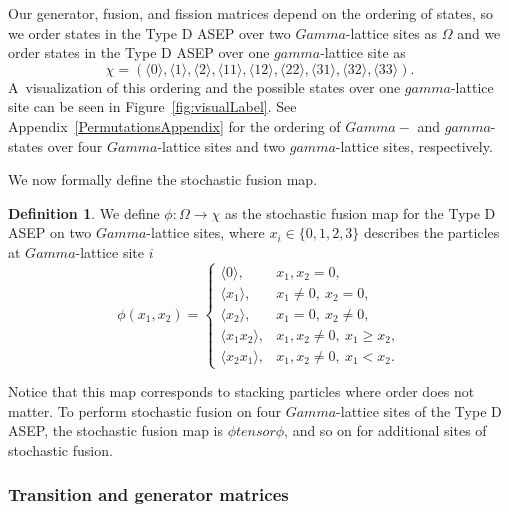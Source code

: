 \documentclass[10pt,a4paper]{amsart}
\numberwithin{equation}{section}
\theoremstyle{definition}
\newtheorem{Definition}[Theorem]{Definition}
\def\Gamma{Gamma}
\def\gamma{gamma}
\def\otimes{ tensor }
\begin{document}
Our generator, fusion, and fission matrices depend on the ordering of states, so we order states in the Type D ASEP over two $\Gamma$-lattice sites as $\Omega$ and we order states in the Type D ASEP over one $\gamma$-lattice site as
\[\chi = ( \langle 0 \rangle,\langle 1 \rangle, \langle 2 \rangle, \langle 11 \rangle, \langle 12 \rangle, \langle 22 \rangle,\langle 31 \rangle,\langle 32 \rangle, \langle 33 \rangle ). \]
 A~visualization of this ordering and the possible states over one $\gamma$-lattice site can be seen in Figure~\ref{fig:visualLabel}. See Appendix~\ref{PermutationsAppendix} for the ordering of $\Gamma-$ and $\gamma$-states over four $\Gamma$-lattice sites and two $\gamma$-lattice sites, respectively.

We now formally define the stochastic fusion map.

\begin{Definition}
\label{StochasticDef}
We define $\phi\colon\Omega \rightarrow \chi$ as the stochastic fusion map for the Type D ASEP on two $\Gamma$-lattice sites, where $x_i \in \{0,1,2,3\}$ describes the particles at $\Gamma$-lattice site $i$
\[
\phi(x_1,x_2)= \begin{cases}
 \langle 0 \rangle, & x_1,x_2 = 0 ,\\
 \langle x_1 \rangle, & x_1 \neq 0, \ x_2 = 0 ,\\
 \langle x_2 \rangle ,& x_1 = 0, \ x_2 \neq 0 , \\
 \langle x_1x_2 \rangle, & x_1,x_2 \neq 0, \ x_1 \geq x_2, \\
 \langle x_2x_1 \rangle ,& x_1,x_2 \neq 0, \ x_1 < x_2.
 \end{cases}
\]
\end{Definition}

Notice that this map corresponds to stacking particles where order does not matter. To perform stochastic fusion on four $\Gamma$-lattice sites of the Type D ASEP, the stochastic fusion map is $\phi \otimes \phi$, and so on for additional sites of stochastic fusion.

\subsubsection{Transition and generator matrices} \label{transition-gen}
\end{document}
